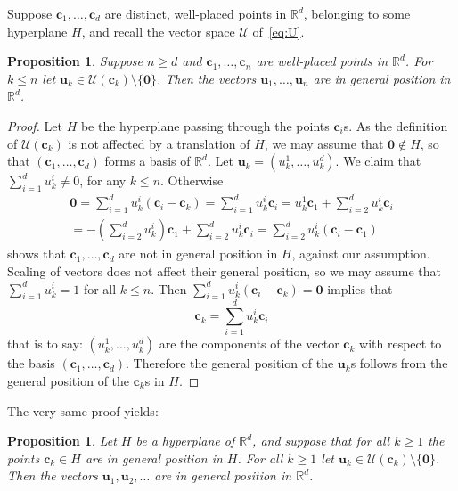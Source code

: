 \documentclass[12pt]{amsart}
\newcommand{\R}{\mathbb{R}}	%
\newcommand{\set}[1]{\mathopen \{ {#1} \mathclose \}} %
\theoremstyle{plain}
\newtheorem{proposition}[theorem]{Proposition}
\theoremstyle{definition}
\theoremstyle{remark}
\begin{document}
Suppose \( \mathbf{c}_1 , \dots , \mathbf{c}_d \) are distinct, well-placed points in \( \R^d \), belonging to some hyperplane \( H \), and recall the vector space \( \mathcal{U} \) of~\eqref{eq:U}.
 
\begin{proposition}\label{prop:frompointstovectors}
Suppose \( n \geq d \) and \( \mathbf{c}_1 , \dots , \mathbf{c}_n \) are well-placed points in \( \R^d \).
For \( k \leq n \) let \( \mathbf{u}_k \in \mathcal{U} (\mathbf{c}_k ) \setminus \set{ \mathbf{0} } \).
Then the vectors \( \mathbf{u}_1 , \dots , \mathbf{u}_n \) are in general position in \( \R^d \).
\end{proposition}

\begin{proof}
Let \( H \) be the hyperplane passing through the points \( \mathbf{c}_i \)s.
As the definition of \( \mathcal{U} ( \mathbf{c}_k ) \) is not affected by a translation of \( H \), we may assume that \( \mathbf{0} \notin H \), so that \( ( \mathbf{c}_1 , \dots , \mathbf{c}_ d ) \) forms a basis of \( \R^d \).
Let \( \mathbf{u}_k = ( u_k^1 , \dots , u_k^d ) \).
We claim that \( \sum_{ i = 1 }^d u_k^i \neq 0 \), for any \( k \leq n \).
Otherwise 
\begin{multline*}
\mathbf{0} = \sum_{ i = 1 }^d u_k ^i ( \mathbf{c}_i - \mathbf{c}_k ) = \sum_{ i = 1 }^d u_k ^i \mathbf{c}_i = u_k^1 \mathbf{c}_1 + \sum_{ i = 2 }^d u_k ^i \mathbf{c}_i 
\\
= - ( \sum_{ i = 2 }^d u_k ^i ) \mathbf{c}_1 + \sum_{ i = 2 }^d u_k ^i \mathbf{c}_i = \sum_{ i = 2 }^d u_k ^i ( \mathbf{c}_i - \mathbf{c} _1 )
\end{multline*}
shows that \( \mathbf{c}_1 , \dots , \mathbf{c}_d \) are not in general position in \( H \), against our assumption.
Scaling of vectors does not affect their general position, so we may assume that \( \sum_{ i = 1 }^d u_k^i = 1 \) for all \( k \leq n \).
Then \( \sum_{ i = 1}^d u_k^i ( \mathbf{c}_i - \mathbf{c}_k ) = \mathbf{0} \) implies that
\[
\mathbf{c}_k = \sum_{ i = 1}^d u_k^i \mathbf{c}_i
\]
that is to say: \( ( u_k^1 , \dots , u_k^d ) \) are the components of the vector \( \mathbf{c}_k \) with respect to the basis \( ( \mathbf{c}_1 , \dots , \mathbf{c}_d ) \).
Therefore the general position of the \( \mathbf{u}_k \)s follows from the general position of the \( \mathbf{c}_k \)s in \( H \).
\end{proof}

The very same proof yields:

\begin{proposition}\label{prop:frompointstovectors2}
Let \( H \) be a hyperplane of \( \R^d \), and suppose that for all \( k \geq 1 \) the points \( \mathbf{c}_k \in H \) are in general position in \( H \).
For all \( k \geq 1 \) let \( \mathbf{u}_k \in \mathcal{U} (\mathbf{c}_k ) \setminus \set{ \mathbf{0} } \).
Then the vectors \( \mathbf{u}_1 , \mathbf{u}_2 , \dots \) are in general position in \( \R^d \).
\end{proposition}
\end{document}
